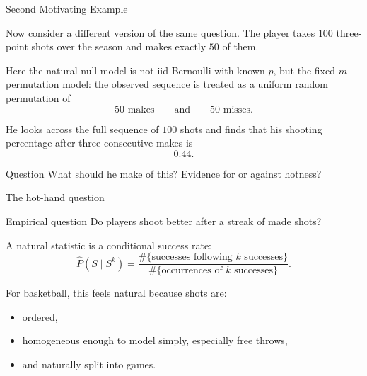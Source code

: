 \documentclass[aspectratio=169,professionalfonts]{beamer}
\begin{document}
\begin{frame}{Second Motivating Example}
\large

Now consider a different version of the same question.
The player takes \(100\) three-point shots over the season and makes exactly
\(50\) of them.  

\medskip

Here the natural null model is not iid Bernoulli with known \(p\), but the
fixed-\(m\) permutation model: the observed sequence is treated as a uniform
random permutation of
\[
50 \text{ makes}
\qquad\text{and}\qquad
50 \text{ misses}.
\]

\medskip

He looks across the full sequence of \(100\) shots and finds that his shooting
percentage after three consecutive makes is 
\[
0.44.
\]

\medskip

\begin{block}{Question}
What should he make of this? Evidence for or against hotness?
\end{block}

\end{frame}

\begin{frame}{The hot-hand question}
\begin{block}{Empirical question}
Do players shoot better after a streak of made shots?
\end{block}

\vspace{0.2cm}
A natural statistic is a conditional success rate:
\[
  \widehat P(S\mid S^k)
  =
  \frac{\#\{\text{successes following }k\text{ successes}\}}
       {\#\{\text{occurrences of }k\text{ successes}\}}.
\]

\vspace{0.2cm}
For basketball, this feels natural because shots are:
\begin{itemize}
  \item ordered,
  \item homogeneous enough to model simply, especially free throws,
  \item and naturally split into games.
\end{itemize}


\end{frame}
\end{document}

